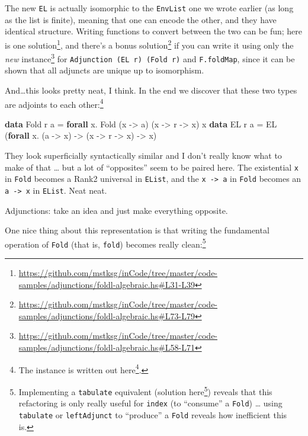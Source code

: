 \documentclass[]{article}
\newenvironment{Shaded}{}{}
\newcommand{\DataTypeTok}[1]{\textcolor[rgb]{0.56,0.13,0.00}{#1}}
\newcommand{\KeywordTok}[1]{\textcolor[rgb]{0.00,0.44,0.13}{\textbf{#1}}}
\newcommand{\NormalTok}[1]{#1}
\newcommand{\OperatorTok}[1]{\textcolor[rgb]{0.40,0.40,0.40}{#1}}
\newcommand{\OtherTok}[1]{\textcolor[rgb]{0.00,0.44,0.13}{#1}}
\renewcommand{\href}[2]{#2\footnote{\url{#1}}}
\begin{document}
The new \texttt{EL} is actually isomorphic to the \texttt{EnvList} one we wrote
earlier (as long as the list is finite), meaning that one can encode the other,
and they have identical structure. Writing functions to convert between the two
can be fun;
\href{https://github.com/mstksg/inCode/tree/master/code-samples/adjunctions/foldl-algebraic.hs\#L31-L39}{here
is one solution}, and there's a
\href{https://github.com/mstksg/inCode/tree/master/code-samples/adjunctions/foldl-algebraic.hs\#L73-L79}{bonus
solution} if you can write it using only the
\href{https://github.com/mstksg/inCode/tree/master/code-samples/adjunctions/foldl-algebraic.hs\#L58-L71}{\emph{new}
instance} for \texttt{Adjunction\ (EL\ r)\ (Fold\ r)} and \texttt{F.foldMap},
since it can be shown that all adjuncts are unique up to isomorphism.

And\ldots this looks pretty neat, I think. In the end we discover that these two
types are adjoints to each other:\footnote{The instance is
  \href{https://github.com/mstksg/inCode/tree/master/code-samples/adjunctions/foldl-algebraic.hs\#L58-L71}{written
  out here}.}

\begin{Shaded}
\begin{Highlighting}[]
\KeywordTok{data} \DataTypeTok{Fold}\NormalTok{ r a }\OtherTok{=} \KeywordTok{forall}\NormalTok{ x}\OperatorTok{.} \DataTypeTok{Fold}\NormalTok{            (x }\OtherTok{{-}>}\NormalTok{ a)    (x }\OtherTok{{-}>}\NormalTok{ r }\OtherTok{{-}>}\NormalTok{ x)    x}
\KeywordTok{data} \DataTypeTok{EL}\NormalTok{   r a }\OtherTok{=}           \DataTypeTok{EL}\NormalTok{   (}\KeywordTok{forall}\NormalTok{ x}\OperatorTok{.}\NormalTok{ (a }\OtherTok{{-}>}\NormalTok{ x) }\OtherTok{{-}>}\NormalTok{ (x }\OtherTok{{-}>}\NormalTok{ r }\OtherTok{{-}>}\NormalTok{ x) }\OtherTok{{-}>}\NormalTok{ x)}
\end{Highlighting}
\end{Shaded}

They look superficially syntactically similar and I don't really know what to
make of that \ldots{} but a lot of ``opposites'' seem to be paired here. The
existential \texttt{x} in \texttt{Fold} becomes a Rank2 universal in
\texttt{EList}, and the \texttt{x\ -\textgreater{}\ a} in \texttt{Fold} becomes
an \texttt{a\ -\textgreater{}\ x} in \texttt{EList}. Neat neat.

Adjunctions: take an idea and just make everything opposite.

One nice thing about this representation is that writing the fundamental
operation of \texttt{Fold} (that is, \texttt{fold}) becomes really
clean:\footnote{Implementing a \texttt{tabulate} equivalent
  (\href{https://github.com/mstksg/inCode/tree/master/code-samples/adjunctions/foldl-algebraic.hs\#L54-L56}{solution
  here}) reveals that this refactoring is only really useful for \texttt{index}
  (to ``consume'' a \texttt{Fold}) \ldots{} using \texttt{tabulate} or
  \texttt{leftAdjunct} to ``produce'' a \texttt{Fold} reveals how inefficient
  this is.}
\end{document}
